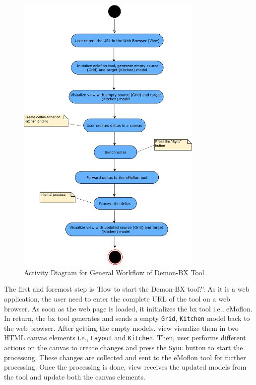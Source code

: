 \begin{figure}
	\includegraphics[width=0.8\textwidth]{figures/Activity_Diagram}
	\caption{Activity Diagram for General Workflow of Demon-BX Tool}
	\label{fig:Activity_Diagram}
\end{figure}

The first and foremost step is 'How to start the Demon-BX tool?'. As it is a web application, the user need to enter the complete URL of the tool on a web browser. As soon as the web page is loaded, it initializes the bx tool i.e., eMoflon. In return, the bx tool generates and sends a empty \texttt{Grid}, \texttt{Kitchen} model back to the web browser. After getting the empty models, view visualize them in two HTML canvas elements i.e., \texttt{Layout} and \texttt{Kitchen}. Then, user performs different actions on the canvas to create changes and press the \texttt{Sync} button to start the processing. These changes are collected and sent to the eMoflon tool for further processing. Once the processing is done, view receives the updated models from the tool and update both the canvas elements.

